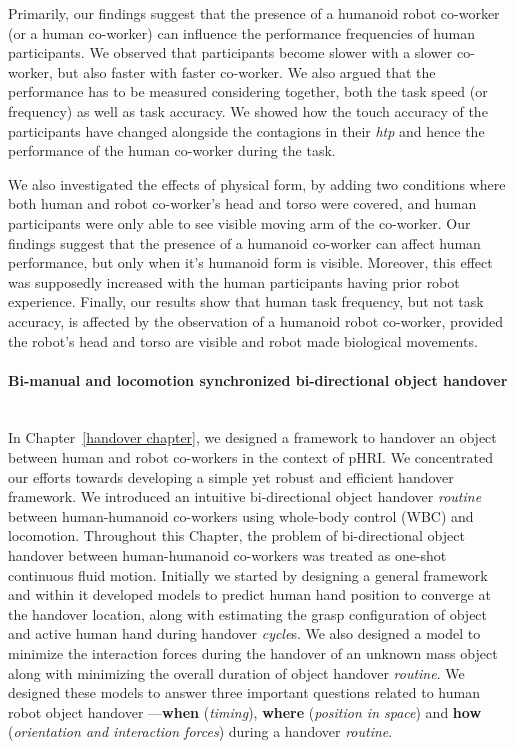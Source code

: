 Primarily, our findings suggest that the presence of a humanoid robot co-worker (or a human co-worker) can influence the performance frequencies of human participants. We observed that participants become slower with a slower co-worker, but also faster with faster co-worker. We also argued that the performance has to be measured considering together, both the task speed (or frequency) as well as task accuracy. We showed how the touch accuracy of the participants have changed alongside the contagions in their {\it htp} and hence the performance of the human co-worker during the task.
 
We also investigated the effects of physical form, by adding two conditions where both human and robot co-worker's head and torso were covered, and human participants were only able to see visible moving arm of the co-worker. Our findings suggest that the presence of a humanoid co-worker can affect human performance, but only when it's humanoid form is visible. Moreover, this effect was supposedly increased with the human participants having prior robot experience. Finally, our results show that human task frequency, but not task accuracy, is affected by the observation of a humanoid robot co-worker, provided the robot's head and torso are visible and robot made biological movements.


\paragraph*{\LARGE {Bi-manual and locomotion synchronized bi-directional object handover \\}\\}

In Chapter~\ref{handover chapter}, we designed a framework to handover an object between human and robot co-workers in the context of pHRI. We concentrated our efforts towards developing a simple yet robust and efficient handover framework. We introduced an intuitive bi-directional object handover \textit{routine} between human-humanoid co-workers using whole-body control (WBC) and locomotion. Throughout this Chapter, the problem of bi-directional object handover between human-humanoid co-workers was treated as one-shot continuous fluid motion. Initially we started by designing a general framework and within it developed models to predict human hand position to converge at the handover location, along with estimating the grasp configuration of object and active human hand during handover \textit{cycle}s. We also designed a model to minimize the interaction forces during the handover of an unknown mass object along with minimizing the overall duration of object handover \textit{routine}. We designed these models to answer three important questions related to human robot object handover ---\textbf{when} (\textit{timing}), \textbf{where} (\textit{position in space}) and \textbf{how} (\textit{orientation and interaction forces}) during a handover \textit{routine}.

